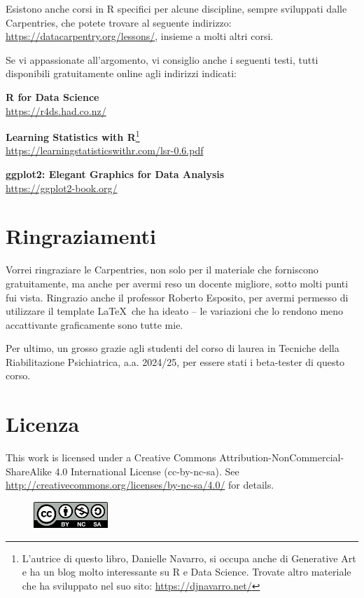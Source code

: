 \noindent Esistono anche corsi in R specifici per alcune discipline, sempre sviluppati dalle Carpentries, che potete trovare al seguente indirizzo: \url{https://datacarpentry.org/lessons/}, insieme a molti altri corsi.

\noindent Se vi appassionate all'argomento, vi consiglio anche i seguenti testi, tutti disponibili gratuitamente online agli indirizzi indicati: 

\begin{myitemize}
	\item \textbf{R for Data Science} \\ \url{https://r4ds.had.co.nz/}
	\item \textbf{Learning Statistics with R}\footnote{L'autrice di questo libro, Danielle Navarro, si occupa anche di Generative Art e ha un blog molto interessante su R e Data Science. Trovate altro materiale che ha sviluppato nel suo sito: \url{https://djnavarro.net/}} \\ \url{https://learningstatisticswithr.com/lsr-0.6.pdf}
	\item \textbf{ggplot2: Elegant Graphics for Data Analysis} \\ \url{https://ggplot2-book.org/}
\end{myitemize}
	
\section{Ringraziamenti}

Vorrei ringraziare le Carpentries, non solo per il materiale che forniscono gratuitamente, ma anche per avermi reso un docente migliore, sotto molti punti fui vista. Ringrazio anche il professor Roberto Esposito, per avermi permesso di utilizzare il template \LaTeX ~che ha ideato -- le variazioni che lo rendono meno accattivante graficamente sono tutte mie. 


\noindent Per ultimo, un grosso grazie agli studenti del corso di laurea in Tecniche della Riabilitazione Psichiatrica, a.a. 2024/25, per essere stati i beta-tester di questo corso.


\section{Licenza}


This work is licensed under a Creative Commons Attribution-NonCommercial-ShareAlike 4.0 International License (cc-by-nc-sa).
See \url{http://creativecommons.org/licenses/by-nc-sa/4.0/} for details. 

\vspace{0.5cm}

\begin{figure}[h!]
 \centering
  \includegraphics[width=0.25\textwidth]{images/CC BY-NC-SA 4.0.png}
\end{figure}